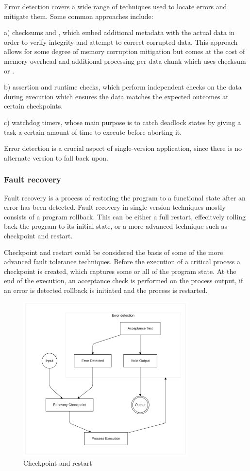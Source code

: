 Error detection covers a wide range of techniques used to locate errors and mitigate them. Some common approaches include:

a) checksums and , which embed additional metadata with the actual data in order to verify integrity and attempt to correct corrupted data. This approach allows for some degree of memory corruption mitigation but comes at the cost of memory overhead and additional processing per data-chunk which uses checksum or .

b) assertion and runtime checks, which perform independent checks on the data during execution which ensures the data matches the expected outcomes at certain checkpoints.

c) watchdog timers, whose main purpose is to catch deadlock states by giving a task a certain amount of time to execute before aborting it.

Error detection is a crucial aspect of single-version application, since there is no alternate version to fall back upon.

\subsubsection{Fault recovery}

Fault recovery is a process of restoring the program to a functional state after an error has been detected. Fault recovery in single-version techniques mostly consists of a program rollback. This can be either a full restart, effecitvely rolling back the program to its initial state, or a more advanced technique such as checkpoint and restart.

Checkpoint and restart could be considered the basis of some of the more advanced fault tolerance techniques. Before the execution of a critical process a checkpoint is created, which captures some or all of the program state. At the end of the execution, an acceptance check is performed on the process output, if an error is detected rollback is initiated and the process is restarted.

\begin{figure}[hbt]
    \centering
    \includegraphics[width=0.8\textwidth]{diagrams/checkpoint/checkpoint.png}
    \caption{Checkpoint and restart}
    \label{fig:checkpoint}
\end{figure}

